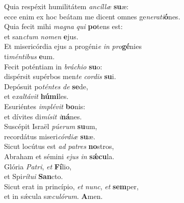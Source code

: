 \oddverse Quia respéxit humilitátem \textit{an}\textit{cíl}\textit{læ} \textbf{su}æ:~\*\\
\oddverse ecce enim ex hoc beátam me dicent omnes ge\textit{ne}\textit{ra}\textit{ti}\textbf{ó}nes.\\
\evenverse Quia fecit mihi \textit{ma}\textit{gna} \textit{qui} \textbf{po}tens est:~\*\\
\evenverse et san\textit{ctum} \textit{no}\textit{men} \textbf{e}jus.\\
\oddverse Et misericórdia ejus a progéni\textit{e} \textit{in} \textit{pro}\textbf{gé}nies~\*\\
\oddverse ti\textit{mén}\textit{ti}\textit{bus} \textbf{e}um.\\
\evenverse Fecit poténtiam in \textit{brá}\textit{chi}\textit{o} \textbf{su}o:~\*\\
\evenverse dispérsit supérbos men\textit{te} \textit{cor}\textit{dis} \textbf{su}i.\\
\oddverse Depósuit po\textit{tén}\textit{tes} \textit{de} \textbf{se}de,~\*\\
\oddverse et e\textit{xal}\textit{tá}\textit{vit} \textbf{hú}\textbf{mi}les.\\
\evenverse Esuriéntes \textit{im}\textit{plé}\textit{vit} \textbf{bo}nis:~\*\\
\evenverse et dívites di\textit{mí}\textit{sit} \textit{i}\textbf{ná}nes.\\
\oddverse Suscépit Israël \textit{pú}\textit{e}\textit{rum} \textbf{su}um,~\*\\
\oddverse recordátus miseri\textit{cór}\textit{di}\textit{æ} \textbf{su}æ.\\
\evenverse Sicut locútus est \textit{ad} \textit{pa}\textit{tres} \textbf{no}stros,~\*\\
\evenverse Abraham et sémini \textit{e}\textit{jus} \textit{in} \textbf{sǽ}\textbf{cu}la.\\
\oddverse Glória \textit{Pa}\textit{tri}, \textit{et} \textbf{Fí}lio,~\*\\
\oddverse et Spi\textit{rí}\textit{tu}\textit{i} \textbf{San}cto.\\
\evenverse Sicut erat in princípio, \textit{et} \textit{nunc}, \textit{et} \textbf{sem}per,~\*\\
\evenverse et in sǽcula sæ\textit{cu}\textit{ló}\textit{rum}. \textbf{A}men.\\
